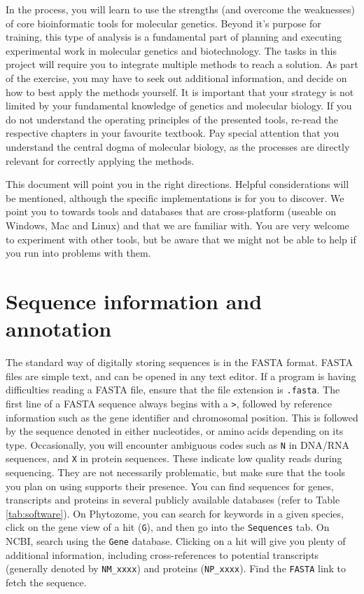 \documentclass[11pt]{article}
\begin{document}
 	
 	In the process, you will learn to use the strengths (and overcome the weaknesses) of core bioinformatic tools for molecular genetics. 
 	Beyond it's purpose for training, this type of analysis is a fundamental part of planning and executing experimental work in molecular genetics and biotechnology.
 	The tasks in this project will require you to integrate multiple methods to reach a solution. 
 	As part of the exercise, you may have to seek out additional information, and decide on how to best apply the methods yourself. 
 	It is important that your strategy is not limited by your fundamental knowledge of genetics and molecular biology. 
 	If you do not understand the operating principles of the presented tools, re-read the respective chapters in your favourite textbook. 
 	Pay special attention that you understand the central dogma of molecular biology, as the processes are directly relevant for correctly applying the methods.
    
    This document will point you in the right directions. 
    Helpful considerations will be mentioned, although the specific implementations is for you to discover.
    We point you to towards tools and databases that are cross-platform (useable on Windows, Mac and Linux) and that we are familiar with. 
    You are very welcome to experiment with other tools, but be aware that we might not be able to help if you run into problems with them.
    
    \section*{Sequence information and annotation}
    The standard way of digitally storing sequences is in the FASTA format. 
    FASTA files are simple text, and can be opened in any text editor. 
    If a program is having difficulties reading a FASTA file, ensure that the file extension is \texttt{.fasta}.
    The first line of a FASTA sequence always begins with a \texttt{>}, followed by reference information such as the gene identifier and chromosomal position.
    This is followed by the sequence denoted in either nucleotides, or amino acids depending on its type.
    Occasionally, you will encounter ambiguous codes such as \texttt{N} in DNA/RNA sequences, and \texttt{X} in protein sequences.
    These indicate low quality reads during sequencing.
    They are not necessarily problematic, but make sure that the tools you plan on using supports their presence.
    You can find sequences for genes, transcripts and proteins in several publicly available databases (refer to Table \ref{tab:software}). 
    On Phytozome, you can search for keywords in a given species, click on the gene view of a hit (\texttt{G}), and then go into the \texttt{Sequences} tab. 
    On NCBI, search using the \texttt{Gene} database. 
    Clicking on a hit will give you plenty of additional information, including cross-references to potential transcripts (generally denoted by \texttt{NM\_xxxx}) and proteins (\texttt{NP\_xxxx}). 
    Find the \texttt{FASTA} link to fetch the sequence.
 
\end{document}
